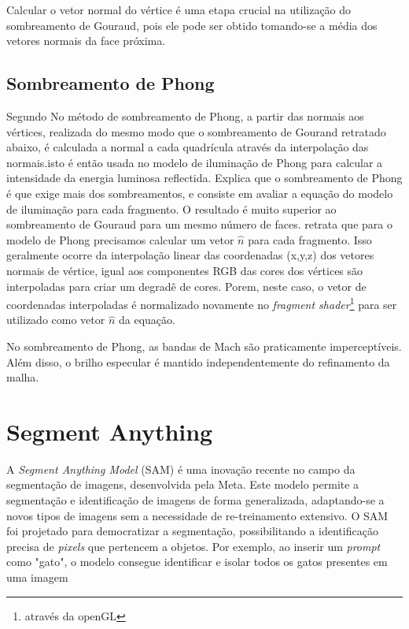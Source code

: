 Calcular o vetor normal do vértice é uma etapa crucial na utilização do sombreamento de Gouraud, pois ele pode ser obtido tomando-se a média dos vetores normais da face próxima.

\subsection{Sombreamento de Phong}

Segundo \cite{Gomes_undated-tr} No método de sombreamento de Phong, a partir das normais aos vértices, realizada do mesmo modo que o sombreamento de Gourand retratado abaixo, é calculada a normal a cada quadrícula através da interpolação das normais.isto é então usada no modelo de iluminação de Phong para calcular a intensidade da energia luminosa reflectida.
 Explica que o sombreamento de Phong é que exige mais dos sombreamentos, e consiste em avaliar a equação do modelo de iluminação para cada fragmento. O resultado é muito superior ao sombreamento de Gouraud para um mesmo número de faces.  retrata que para o modelo de Phong precisamos calcular um vetor \begin{math}\hat{n}\end{math} para cada fragmento. Isso geralmente ocorre da interpolação linear das coordenadas (x,y,z) dos vetores normais de vértice, igual aos componentes RGB das cores dos vértices são interpoladas para criar um degradê de cores. Porem, neste caso, o vetor de coordenadas interpoladas é normalizado novamente no \textit{fragment shader}\footnote{através da openGL} para ser utilizado como vetor \begin{math}\hat{n}\end{math} da equação.

No sombreamento de Phong, as bandas de Mach são praticamente imperceptíveis. Além disso, o brilho especular é mantido independentemente do refinamento da malha.


\section{}



\section{Segment Anything}
A \textit{Segment Anything Model} (SAM) é uma inovação recente no campo da segmentação de imagens, desenvolvida pela Meta. Este modelo permite a segmentação e identificação de imagens de forma generalizada, adaptando-se a novos tipos de imagens sem a necessidade de re-treinamento extensivo. O SAM foi projetado para democratizar a segmentação, possibilitando a identificação precisa de \textit{pixels} que pertencem a objetos. Por exemplo, ao inserir um \textit{prompt} como "gato", o modelo consegue identificar e isolar todos os gatos presentes em uma imagem \cite{kirillov2023segany}

